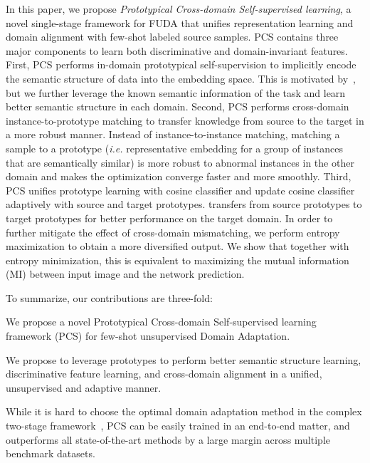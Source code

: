 \documentclass[final]{cvpr}
\newenvironment{packed_itemize}{
	\begin{itemize}
		\setlength{\itemsep}{0pt}
		\setlength{\parskip}{0pt}
		\setlength{\parsep}{0pt}
	}{\end{itemize}}
\begin{document}
In this paper, we propose \textit{Prototypical Cross-domain Self-supervised learning}, a novel single-stage framework for FUDA that unifies representation learning and domain alignment with few-shot labeled source samples. PCS contains three major components to learn both discriminative and domain-invariant features. First, PCS performs in-domain prototypical self-supervision to implicitly encode the semantic structure of data into the embedding space. This is motivated by~\cite{li2020prototypical}, but we further leverage the known semantic information of the task and learn better semantic structure in each domain. 
Second, PCS performs cross-domain instance-to-prototype matching to transfer knowledge from source to the target in a more robust manner. Instead of instance-to-instance matching, matching a sample to a prototype (\textit{i.e. }representative embedding for a group of instances that are semantically similar) is more robust to abnormal instances in the other domain and makes the optimization converge faster and more smoothly. 
Third, PCS unifies prototype learning with cosine classifier and update cosine classifier adaptively with source and target prototypes. 
transfers from source prototypes to target prototypes for better performance on the target domain. 
In order to further mitigate the effect of cross-domain mismatching, we perform entropy maximization to obtain a more diversified output. We show that together with entropy minimization, this is equivalent to maximizing the mutual information (MI) between input image and the network prediction. 

To summarize, our contributions are three-fold:
\vspace{-1.3mm}
\begin{packed_itemize}
 \item We propose a novel Prototypical Cross-domain Self-supervised learning framework (PCS) for few-shot unsupervised Domain Adaptation. 
 \item We propose to leverage prototypes to perform better semantic structure learning, discriminative feature learning, and cross-domain alignment in a unified, unsupervised and adaptive manner. 
 \item While it is hard to choose the optimal domain adaptation method in the complex two-stage framework~\cite{kim2020cross}, PCS can be easily trained in an end-to-end matter, and outperforms all state-of-the-art methods by a large margin across multiple benchmark datasets. 
\end{packed_itemize}
\end{document}
